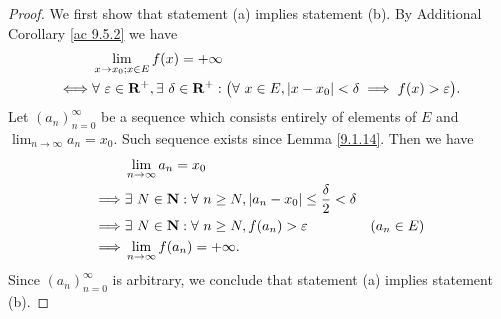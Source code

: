 \begin{proof}
    We first show that statement (a) implies statement (b).
    By Additional Corollary \ref{ac 9.5.2} we have
    \begin{align*}
             & \lim_{x \to x_0 ; x \in E} f(x) = +\infty                                                                                                                  \\
        \iff & \forall\ \varepsilon \in \mathbf{R}^+, \exists\ \delta \in \mathbf{R}^+ : \big(\forall\ x \in E, \abs*{x - x_0} < \delta \implies f(x) > \varepsilon\big).
    \end{align*}
    Let \((a_n)_{n = 0}^\infty\) be a sequence which consists entirely of elements of \(E\) and \(\lim_{n \to \infty} a_n = x_0\).
    Such sequence exists since Lemma \ref{9.1.14}.
    Then we have
    \begin{align*}
                 & \lim_{n \to \infty} a_n = x_0                                                                                \\
        \implies & \exists\ N \in \mathbf{N} : \forall\ n \geq N, \abs*{a_n - x_0} \leq \frac{\delta}{2} < \delta               \\
        \implies & \exists\ N \in \mathbf{N} : \forall\ n \geq N, f(a_n) > \varepsilon                            & (a_n \in E) \\
        \implies & \lim_{n \to \infty} f(a_n) = +\infty.
    \end{align*}
    Since \((a_n)_{n = 0}^\infty\) is arbitrary, we conclude that statement (a) implies statement (b).


\end{proof}
